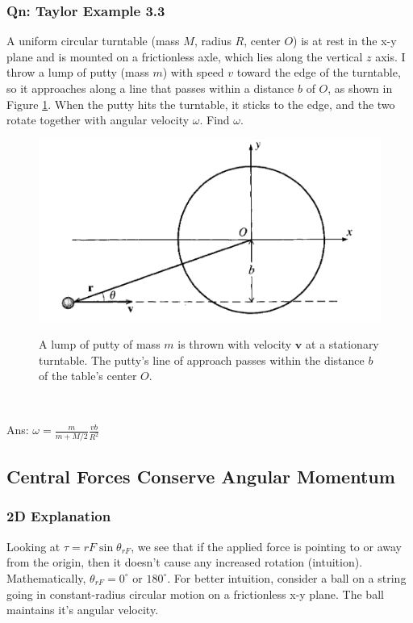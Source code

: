 \documentclass{article}
\begin{document}
\subsubsection{Qn: Taylor Example 3.3}
A uniform circular turntable (mass $M$, radius $R$, center $O$) is at rest in the x-y plane and is mounted on a frictionless axle, which lies along the vertical $z$ axis. I throw a lump of putty (mass $m$) with speed $v$ toward the edge of the turntable, so it approaches along a line that passes within a distance $b$ of $O$, as shown in Figure \ref{fig:taylor3.3}. When the putty hits the turntable, it sticks to the edge, and the two rotate together with angular velocity $\omega$. Find $\omega$. \\
{
\begin{figure} 
\includegraphics[width=\linewidth]{images/taylor3.3.png}
\label{fig:taylor3.3}
\caption{A lump of putty of mass $m$ is thrown with velocity $\mathbf{v}$ at a stationary turntable. The putty's line of approach passes within the distance $b$ of the table's center $O$.}
\end{figure}\\[200pt]
}
\noindent Ans: $\omega = \frac{m}{m+M/2} \frac{vb}{R^2}$
\subsection{Central Forces Conserve Angular Momentum}
\label{chap:centralforce}
\subsubsection{2D Explanation}
Looking at $\tau = rF \sin \theta_{rF}$, we see that if the applied force is pointing to or away from the origin, then it doesn't cause any increased rotation (intuition). Mathematically, $\theta_{rF}=0^\circ\text{ or } 180^\circ$. For better intuition, consider a ball on a string going in constant-radius circular motion on a frictionless x-y plane. The ball maintains it's angular velocity. 
\end{document}
